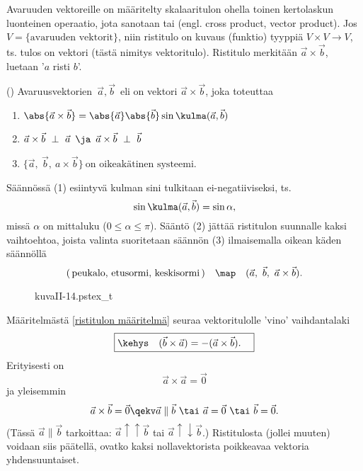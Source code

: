 Avaruuden vektoreille on määritelty skalaaritulon ohella toinen kertolaskun luonteinen
operaatio, jota sanotaan  tai  (engl. cross product,
vector product). Jos $V=\{\text{avaruuden vektorit}\}$, niin ristitulo on kuvaus (funktio)
tyyppiä  $V \times V \rightarrow V$, ts. tulos on vektori (tästä nimitys vektoritulo).
Ristitulo merkitään $\vec a \times \vec b$, luetaan '$a$ risti $b$'.
\begin{Def} () \label{ristitulon määritelmä}
 
Avaruusvektorien $\,\vec a, \vec b\,$  eli  on vektori 
$\vec a \times \vec b$, joka toteuttaa
\begin{enumerate}
\item $\abs{\vec a \times \vec b} = \abs{\vec a}\abs{\vec b}\sin{\kulma(\vec a, \vec b)}$
\item $\vec a \times \vec b \ \perp \ \vec a \,\ \ja \,\ \vec a \times \vec b \ \perp \ \vec b$
\item $\{\vec a,\ \vec b,\ a \times \vec b\} \ \text{on oikeakätinen systeemi}$.
\end{enumerate}
\end{Def}
Säännössä (1) esiintyvä kulman sini tulkitaan ei-negatiiviseksi, ts.\
\[
\sin\kulma(\vec a,\vec b) = \sin\alpha,
\]
missä $\alpha$ on  mittaluku ($0\le\alpha\le\pi$). Sääntö (2) jättää
ristitulon suunnalle kaksi vaihtoehtoa, joista valinta suoritetaan säännön (3) ilmaisemalla
oikean käden säännöllä
\[
(\,\text{peukalo},\,\text{etusormi},\,\text{keskisormi}\,) 
                       \quad \map \quad (\vec a,\ \vec b,\ \vec a \times \vec b).
\]
\begin{figure}[H]
\begin{center}
{kuvaII-14.pstex_t}
\end{center}
\end{figure}
Määritelmästä \ref{ristitulon määritelmä} seuraa vektoritulolle 'vino' vaihdantalaki
\begin{equation} \label{cross1}
\boxed{\kehys\quad (\vec b \times \vec a) = - (\vec a \times \vec b). \quad}
\end{equation}
Erityisesti on
\[
\vec a \times \vec a = \vec 0
\]
ja yleisemmin
\[
\vec a \times \vec b = \vec 0 \qekv \vec a \parallel \vec b \ \tai \ \vec a = \vec 0 \ 
                                                              \tai \ \vec b = \vec 0.
\]
(Tässä $\vec a \parallel \vec b$ tarkoittaa: $\vec a \uparrow \uparrow \vec b$ tai 
$\vec a \uparrow \downarrow \vec b$.) Ristitulosta (jollei muuten) voidaan siis päätellä, ovatko
kaksi nollavektorista poikkeavaa vektoria yhdensuuntaiset.


